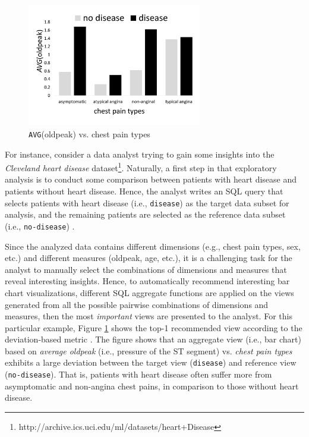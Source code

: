 \begin{figure}
	\includegraphics[width=3.0in]{figures/introduction/cp_avg_oldpeak}
	\vspace{-12pt}
	\caption{{\tt AVG}(oldpeak) vs. chest pain types}
	\label{fig:intro1}
	\vspace{-10pt}
\end{figure}



For instance, consider a data analyst trying to gain some insights into the {\em Cleveland heart disease} dataset\footnote{http://archive.ics.uci.edu/ml/datasets/heart+Disease}. 
%
Naturally, a first step in that exploratory analysis is to conduct some comparison between patients with heart disease and patients without heart disease.
%
Hence, the analyst writes an SQL query that selects patients with heart disease (i.e., {\tt disease}) as the target data subset for analysis, and the remaining patients are selected as the reference data subset (i.e., {\tt no-disease}) .

Since the analyzed data contains different dimensions (e.g., chest pain types, sex, etc.) and different measures (oldpeak, age, etc.), it is a challenging task for the analyst to manually select the combinations of dimensions and measures that reveal interesting insights.
%
Hence, to automatically recommend interesting bar chart visualizations, different SQL aggregate functions are applied on the views generated from all the possible pairwise combinations of dimensions and measures, then the most {\em important} views are presented to the analyst.
%
For this particular example, Figure \ref{fig:intro1} shows the top-1 recommended view according to the deviation-based metric \cite{Vartak2015, Vartak2014}. 
%
The figure shows that an aggregate view (i.e., bar chart) based on {\it average oldpeak} (i.e.,  pressure of the ST segment) vs. {\it chest pain types} exhibits a large deviation between the target view ({\tt disease}) and reference view ({\tt no-disease}). 
%
That is, patients with heart disease often suffer more from asymptomatic and non-angina chest pains, in comparison to those without heart disease.  

